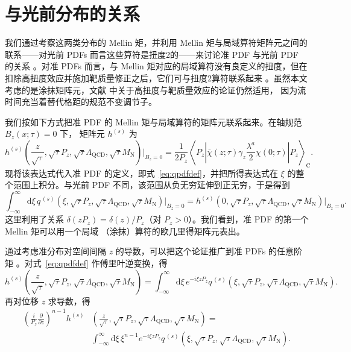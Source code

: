 \section{\label{sec:spdf}与光前分布的关系}

我们通过考察这两类分布的 Mellin 矩，并利用 Mellin 矩与局域算符矩阵元之间的联系——对光前 PDFs 而言这些算符是扭度2的——来讨论准 PDF 与光前 PDF 的关系 \cite{Christ:1972ms}。对准 PDFs 而言，与 Mellin 矩对应的局域算符没有良定义的扭度，但在扣除高扭度效应并施加靶质量修正之后，它们可与扭度2算符联系起来
\cite{Lin:2014zya,Alexandrou:2015rja}。虽然本文考虑的是涂抹矩阵元，文献 \cite{Lin:2014zya,Alexandrou:2015rja} 中关于高扭度与靶质量效应的论证仍然适用，
因为流时间充当着替代格距的规范不变调节子。

我们按如下方式把准 PDF 的 Mellin 矩与局域算符的矩阵元联系起来。在轴规范 $B_z(x;\tau)=0$ 下，
矩阵元 $h^{(s)}$ 为
\begin{equation}\label{eq:hAzdef}
h^{(s)}\left(\frac{z}{\sqrt{\tau}},\sqrt{\tau}P_z,\sqrt{\tau}\Lambda_{\mathrm{QCD}},
\sqrt{\tau}
M_\mathrm{N}\right)\Big|_{B_z=0} =
\frac{1}{2P_z}\left\langle
P_z \left| \overline{\chi}(z;\tau)
\gamma_z\frac{\lambda^a}{2}\chi(0;\tau)\right|
P_z\right\rangle_\mathrm{C}.
\end{equation}
现将该表达式代入准 PDF 的定义，即式~\eqref{eq:qpdfdef}，并把所得表达式在 $\xi$ 的整个范围上积分。与光前
PDF 不同，该范围从负无穷延伸到正无穷，于是得到
\begin{equation}
\int_{-\infty}^\infty
\mathrm{d}\xi\,
q^{\,(s)}\left(\xi,\sqrt{\tau}P_z,\sqrt{\tau}\Lambda_{\mathrm{QCD}},\sqrt{\tau}
M_\mathrm{N}\right)\Big|_{B_z=0}
=
h^{(s)}(0,\sqrt{\tau}P_z,\sqrt{\tau}\Lambda_{\mathrm{QCD}},\sqrt{\tau}M_\mathrm{
N}
)\Big|_{B_z=0}.
\end{equation}
这里利用了关系 $\delta(zP_z) =
\delta(z)/P_z$（对 $P_z>0$）。我们看到，准 PDF 的第一个 Mellin 矩可以用一个局域
（涂抹）算符的欧几里得矩阵元表出。

通过考虑准分布对空间间隔 $z$ 的导数，可以把这个论证推广到准 PDFs 的任意阶矩 \cite{Collins:2011zzd}。对式~\eqref{eq:qpdfdef} 作傅里叶逆变换，得
\begin{equation}\label{eq:handqpdf}
h^{(s)}\left(\frac{z}{\sqrt{\tau}},\sqrt{\tau}P_z,\sqrt{\tau}\Lambda_{\mathrm{QCD}},
\sqrt{\tau}
M_\mathrm{N}\right)
=
\int_{-\infty}^\infty \mathrm{d}\xi\, e^{-i\xi z
P_z}
q^{\,(s)}\left(\xi,\sqrt{\tau}P_z,\sqrt{\tau}\Lambda_{\mathrm{QCD}},\sqrt{\tau}
M_\mathrm{N}\right).
\end{equation}
再对位移 $z$ 求导数，得
\begin{align}\label{eq:hint1}
\left(\frac{i}{P_z}\frac{\partial}{\partial
z}\right)^{n-1}
h^{(s)}{} &
\left(\frac{z}{\sqrt{\tau}},\sqrt{\tau}P_z,\sqrt{\tau}\Lambda_{\mathrm{QCD}},
\sqrt{\tau}
M_\mathrm{N}\right) = \nonumber\\
{} & \int_{-\infty}^\infty \mathrm{d}\xi\, \xi^{n-1}e^{-i\xi z
P_z}
q^{\,(s)}\left(\xi,\sqrt{\tau}P_z,\sqrt{\tau}\Lambda_{\mathrm{QCD}},\sqrt{\tau}
M_\mathrm{N}\right).
\end{align}

